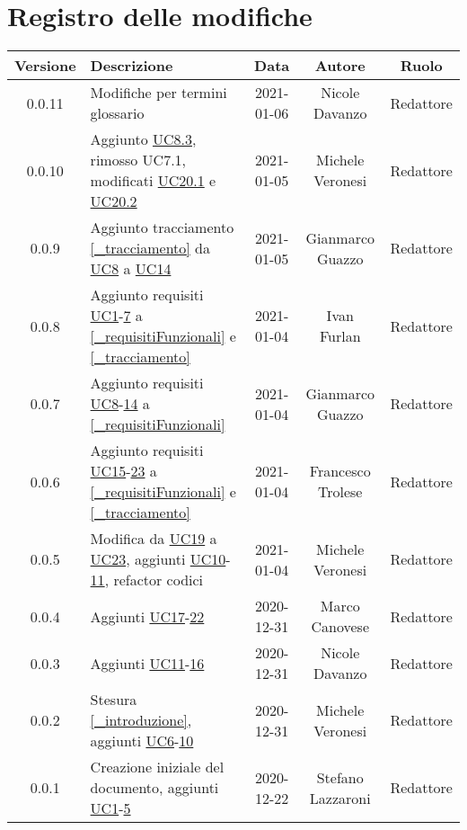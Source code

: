 \section*{Registro delle modifiche}

\begin{center}
	\begin{longtable}{|c|p{5cm}|c|c|c|}
	\hline
	\rowcolor{lighter-grayer}
	\textbf{Versione} & \textbf{Descrizione} & \textbf{Data} & \textbf{Autore} & \textbf{Ruolo} \\
	\hline
	\endfirsthead


	\hline
	0.0.11 & Modifiche per termini glossario & 2021-01-06 & Nicole Davanzo & Redattore \\
	0.0.10 & Aggiunto \hyperref[UC8.3]{UC8.3}, rimosso UC7.1, modificati \hyperref[UC20.1]{UC20.1} e \hyperref[UC20.2]{UC20.2} & 2021-01-05 & Michele Veronesi & Redattore \\
	0.0.9 & Aggiunto tracciamento \ref{_tracciamento} da \hyperref[UC8]{UC8} a \hyperref[UC14]{UC14} & 2021-01-05 & Gianmarco Guazzo & Redattore \\
	0.0.8 & Aggiunto requisiti \hyperref[UC1]{UC1}-\hyperref[UC7]{7} a \ref{_requisitiFunzionali} e \ref{_tracciamento} & 2021-01-04 & Ivan Furlan & Redattore \\
	0.0.7 & Aggiunto requisiti \hyperref[UC8]{UC8}-\hyperref[UC14]{14} a \ref{_requisitiFunzionali} & 2021-01-04 & Gianmarco Guazzo & Redattore \\
	0.0.6 & Aggiunto requisiti \hyperref[UC15]{UC15}-\hyperref[UC23]{23} a \ref{_requisitiFunzionali} e \ref{_tracciamento} & 2021-01-04 & Francesco Trolese & Redattore \\
	0.0.5 & Modifica da \hyperref[UC19]{UC19} a \hyperref[UC23]{UC23}, aggiunti \hyperref[UC10]{UC10}-\hyperref[UC11]{11}, refactor codici & 2021-01-04 & Michele Veronesi & Redattore \\
	0.0.4 & Aggiunti \hyperref[UC17]{UC17}-\hyperref[UC22]{22} & 2020-12-31 & Marco Canovese & Redattore\\
	0.0.3 & Aggiunti \hyperref[UC11]{UC11}-\hyperref[UC16]{16} & 2020-12-31 & Nicole Davanzo & Redattore\\
	0.0.2 & Stesura \ref{_introduzione}, aggiunti \hyperref[UC6]{UC6}-\hyperref[UC10]{10} & 2020-12-31 & Michele Veronesi & Redattore\\
    0.0.1 & Creazione iniziale del documento, aggiunti \hyperref[UC1]{UC1}-\hyperref[UC5]{5} & 2020-12-22 & Stefano Lazzaroni & Redattore\\
	\hline

	\end{longtable}
\end{center}